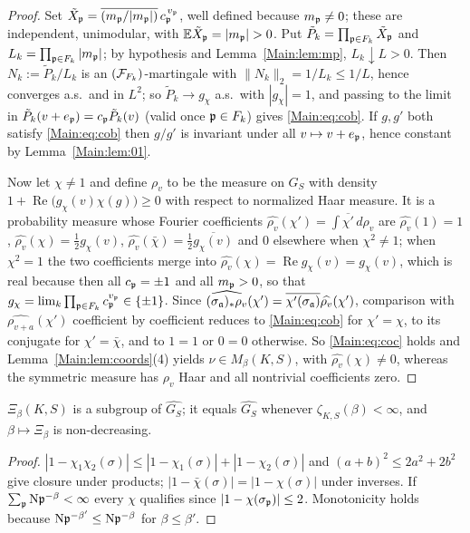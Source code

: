 \begin{proof}
Set $\tilde X_{\mathfrak{p}}=\overline{(m_{\mathfrak{p}}/|m_{\mathfrak{p}}|)}\,c_{\mathfrak{p}}^{\,v_{\mathfrak{p}}}$, well defined
because $m_{\mathfrak{p}}\neq0$; these are independent, unimodular, with
$\mathbb E\tilde X_\pp=|m_\pp|>0$. Put $\tilde P_k=\prod_{\mathfrak{p}\in F_k}\tilde X_{\mathfrak{p}}$
and $L_k=\prod_{\mathfrak{p}\in F_k}|m_{\mathfrak{p}}|$; by hypothesis and Lemma~\ref{Main:lem:mp},
$L_k\downarrow L>0$. Then $N_k:=\tilde P_k/L_k$ is an $(\mathcal{F}_{F_k})$-martingale
with $\|N_k\|_2=1/L_k\le1/L$, hence converges a.s.\ and in $L^2$; so
$\tilde P_k\to g_\chi$ a.s.\ with $|g_\chi|=1$, and passing to the limit in
$\tilde P_k(v+e_{\mathfrak{p}})=c_{\mathfrak{p}}\tilde P_k(v)$ (valid once $\mathfrak{p}\in F_k$) gives
\eqref{Main:eq:cob}. If $g,g'$ both satisfy \eqref{Main:eq:cob} then $g/g'$ is invariant
under all $v\mapsto v+e_{\mathfrak{p}}$, hence constant by Lemma~\ref{Main:lem:01}.

Now let $\chi\neq1$ and define $\rho_v$ to be the measure on $G_S$ with density
$1+\operatorname{Re}\bigl(g_\chi(v)\chi(g)\bigr)\ge0$ with respect to
normalized Haar measure. It is a probability measure whose Fourier coefficients
$\widehat{\rho_v}(\chi')=\int\overline{\chi'}\,d\rho_v$ are
$\widehat{\rho_v}(1)=1$, $\widehat{\rho_v}(\chi)=\tfrac12g_\chi(v)$,
$\widehat{\rho_v}(\bar\chi)=\tfrac12\overline{g_\chi(v)}$ and $0$ elsewhere when
$\chi^2\neq1$; when $\chi^2=1$ the two coefficients merge into
$\widehat{\rho_v}(\chi)=\operatorname{Re}g_\chi(v)=g_\chi(v)$, which is real because then
all $c_{\mathfrak{p}}=\pm1$ and all $m_{\mathfrak{p}}>0$, so that $g_\chi=\lim_k\prod_{\mathfrak{p}\in F_k}c_{\mathfrak{p}}^{v_{\mathfrak{p}}}\in\{\pm1\}$.
Since $\widehat{(\sigma_{\mathfrak{a}})_*\rho_v}(\chi')=\overline{\chi'(\sigma_{\mathfrak{a}})}\widehat{\rho_v}(\chi')$,
comparison with $\widehat{\rho_{v+a}}(\chi')$ coefficient by coefficient reduces
to \eqref{Main:eq:cob} for $\chi'=\chi$, to its conjugate for $\chi'=\bar\chi$, and
to $1=1$ or $0=0$ otherwise. So \eqref{Main:eq:coc} holds and
Lemma~\ref{Main:lem:coords}(4) yields $\nu\in M_\beta(K,S)$, with
$\widehat{\rho_v}(\chi)\neq0$, whereas the symmetric measure has $\rho_v$ Haar
and all nontrivial coefficients zero.
\end{proof}

\begin{lemma}\label{Main:lem:subgroup}
$\Xi_\beta(K,S)$ is a subgroup of $\widehat{G_S}$; it equals $\widehat{G_S}$
whenever $\zeta_{K,S}(\beta)<\infty$, and $\beta\mapsto\Xi_\beta$ is
non-decreasing.
\end{lemma}

\begin{proof}
$|1-\chi_1\chi_2(\sigma)|\le|1-\chi_1(\sigma)|+|1-\chi_2(\sigma)|$ and
$(a+b)^2\le2a^2+2b^2$ give closure under products;
$|1-\bar\chi(\sigma)|=|1-\chi(\sigma)|$ under inverses. If
$\sum_{\mathfrak{p}}\mathrm{N}\mathfrak{p}^{-\beta}<\infty$ every $\chi$ qualifies since
$|1-\chi(\sigma_{\mathfrak{p}})|\le2$. Monotonicity holds because
$\mathrm{N}\mathfrak{p}^{-\beta'}\le\mathrm{N}\mathfrak{p}^{-\beta}$ for $\beta\le\beta'$.
\end{proof}

